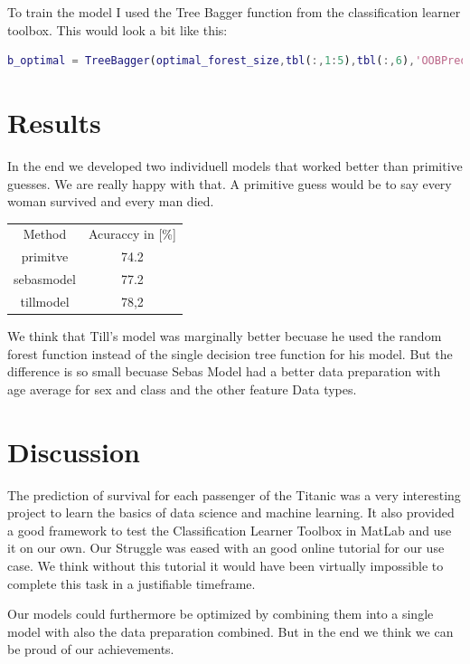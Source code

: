 \documentclass[
   10.5pt,
   invert-title=true,
   titlepage=false,
   titleimage-ratio=13,
   class=article
]{bfhpub}				%
\begin{document}
To train the model I used the Tree Bagger function from the classification learner toolbox. This would look a bit like this:
\begin{lstlisting}[language=Matlab]
b_optimal = TreeBagger(optimal_forest_size,tbl(:,1:5),tbl(:,6),'OOBPredictorImportance','off','OOBPrediction','on');
\end{lstlisting}


\section*{Results}
In the end we developed two individuell models that worked better than primitive guesses. We are really happy with that. A primitive guess would be to say every woman survived and every man died.

\begin{center}
	\begin{tabular}{ c c }
		Method & Acuraccy in [\%] \\
		primitve & 74.2 \\ 
		sebasmodel & 77.2 \\
		tillmodel & 78,2    
	\end{tabular}
\end{center}
We think that Till's model was marginally better becuase he used the random forest function instead of the single decision tree function for his model. But the difference is so small becuase Sebas Model had a better data preparation with age average for sex and class and the other feature Data types.

\section*{Discussion}
The prediction of survival for each passenger of the Titanic was a very interesting project to learn the basics of data science and machine learning. It also provided a good framework to test the Classification Learner Toolbox in MatLab and use it on our own. Our Struggle was eased with an good online tutorial for our use case. We think without this tutorial it would have been virtually impossible to complete this task in a justifiable timeframe.

Our models could furthermore be optimized by combining them into a single model with also the data preparation combined.
But in the end we think we can be proud of our achievements.



\end{document}
